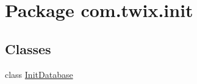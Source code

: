 \hypertarget{namespacecom_1_1twix_1_1init}{\section{Package com.\-twix.\-init}
\label{namespacecom_1_1twix_1_1init}
}
\subsection*{Classes}
\begin{DoxyCompactItemize}
\item 
class \hyperlink{classcom_1_1twix_1_1init_1_1_init_database}{Init\-Database}
\end{DoxyCompactItemize}
